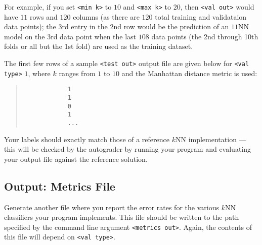 \documentclass[11pt,addpoints,answers]{exam}
\begin{document}
\begin{enumerate}
    For example, if you set \lstinline{<min k>} to $10$ and \lstinline{<max k>} to $20$, then \lstinline{<val out>} would have $11$ rows and $120$ columns (as there are $120$ total training and validataion data points); the 3rd entry in the 2nd row would be the prediction of an $11$NN model on the 3rd data point when the last $108$ data points (the 2nd through 10th folds or all but the 1st fold) are used as the training dataset. 
    
    The first few rows of a sample \lstinline{<test out>} output file are given below for \lstinline{<val type>} $1$, where $k$ ranges from $1$ to $10$ and the Manhattan distance metric is used:
    \begin{quote}
        \begin{verbatim}
            1
            1
            0
            1
            ...
        \end{verbatim}
    \end{quote}
\end{enumerate}

Your labels should exactly match those of a reference $k$NN implementation --- this will be checked by the autograder by running your program and evaluating your output file against the reference solution.

\subsection{Output: Metrics File}
\label{sec:metrics}

Generate another file where you report the error rates for the various $k$NN classifiers your program implements. This file should be written to the path specified by the command line argument \lstinline{<metrics out>}. Again, the contents of this file will depend on \lstinline{<val type>}.
\end{document}
